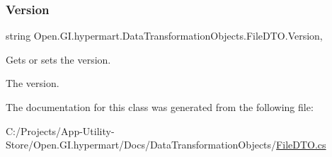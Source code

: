 \subsubsection{\texorpdfstring{Version}{Version}}
{\footnotesize\ttfamily string Open.\+G\+I.\+hypermart.\+Data\+Transformation\+Objects.\+File\+D\+T\+O.\+Version\hspace{0.3cm}{\ttfamily [get]}, {\ttfamily [set]}}



Gets or sets the version. 

The version. 

The documentation for this class was generated from the following file\+:\begin{DoxyCompactItemize}
\item 
C\+:/\+Projects/\+App-\/\+Utility-\/\+Store/\+Open.\+G\+I.\+hypermart/\+Docs/\+Data\+Transformation\+Objects/\hyperlink{_file_d_t_o_8cs}{File\+D\+T\+O.\+cs}\end{DoxyCompactItemize}
